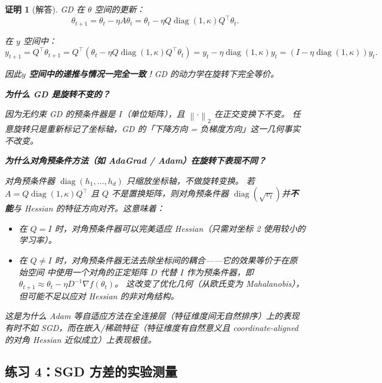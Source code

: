 \documentclass[12pt,a4paper]{ctexart}
\theoremstyle{definition}
\theoremstyle{plain}
\newtheorem*{proof*}{证明}
\newcommand{\diag}{\operatorname{diag}}
\newcommand{\grad}{\nabla}
\newcommand{\norm}[1]{\left\lVert #1 \right\rVert}
\begin{document}
\begin{proof*}[解答]
GD 在 $\theta$ 空间的更新：
\begin{equation}
  \theta_{t+1} = \theta_t - \eta A\theta_t
  = \theta_t - \eta Q\diag(1,\kappa)Q^\top\theta_t.
\end{equation}

在 $y$ 空间中：
\begin{equation}
  y_{t+1} = Q^\top\theta_{t+1}
  = Q^\top(\theta_t - \eta Q\diag(1,\kappa)Q^\top\theta_t)
  = y_t - \eta \diag(1,\kappa) y_t
  = (I - \eta\diag(1,\kappa)) y_t.
\end{equation}

因此\textbf{$y$ 空间中的递推与情况一完全一致}！GD 的动力学在旋转下完全等价。

\medskip
\noindent\textbf{为什么 GD 是旋转不变的？}

因为无约束 GD 的预条件器是 $I$（单位矩阵），且 $\norm{\cdot}_2$ 在正交变换下不变。
任意旋转只是重新标记了坐标轴，GD 的「下降方向 = 负梯度方向」这一几何事实不改变。

\medskip
\noindent\textbf{为什么对角预条件方法（如 AdaGrad / Adam）在旋转下表现不同？}

对角预条件器 $\diag(h_1, \dots, h_d)$ 只缩放坐标轴，不做旋转变换。
若 $A = Q\diag(1,\kappa)Q^\top$ 且 $Q$ 不是置换矩阵，则对角预条件器 $\diag(\sqrt{v_t})$并\textbf{不能}与 Hessian 的特征方向对齐。这意味着：

\begin{itemize}
  \item 在 $Q=I$ 时，对角预条件器可以完美适应 Hessian（只需对坐标 2 使用较小的学习率）。
  \item 在 $Q \neq I$ 时，对角预条件器无法去除坐标间的耦合——它的效果等价于在原始空间
    中使用一个对角的正定矩阵 $D$ 代替 $I$ 作为预条件器，即 $\theta_{t+1} \approx \theta_t - \eta D^{-1}\grad f(\theta_t)$。
    这改变了优化几何（从欧氏变为 Mahalanobis），但可能不足以应对 Hessian 的非对角结构。
\end{itemize}

这是为什么 Adam 等自适应方法在全连接层（特征维度间无自然排序）上的表现有时不如 SGD，而在嵌入/稀疏特征（特征维度有自然意义且 coordinate-aligned 的对角 Hessian 近似成立）上表现极佳。

\end{proof*}

\subsection{练习 4：SGD 方差的实验测量}
\end{document}
